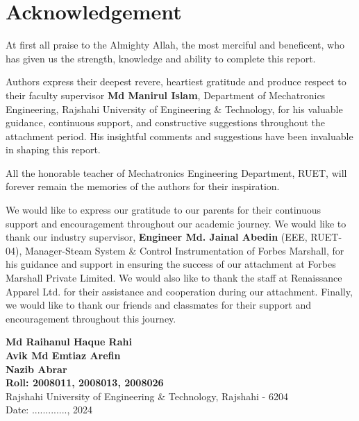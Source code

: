 \section*{Acknowledgement}
 
At first all praise to the Almighty Allah, the most merciful and beneficent, who has given us the strength, knowledge and ability to complete this report. 

Authors express their deepest revere, heartiest gratitude and produce respect to their faculty supervisor \textbf{Md Manirul Islam}, Department of Mechatronics Engineering, Rajshahi University of Engineering \& Technology, for his valuable guidance, continuous support, and constructive suggestions throughout the attachment period. His insightful comments and suggestions have been invaluable in shaping this report.

All the honorable teacher of Mechatronics Engineering Department, RUET, will forever remain the memories of the authors for their inspiration. 

We would like to express our gratitude to our parents for their continuous support and encouragement throughout our academic journey. We would like to thank our industry supervisor, \textbf{Engineer Md. Jainal Abedin} (EEE, RUET-04), Manager-Steam System \& Control Instrumentation of Forbes Marshall, for his guidance and support in ensuring the success of our attachment at Forbes Marshall Private Limited. We would also like to thank the staff at Renaissance Apparel Ltd. for their assistance and cooperation during our attachment. Finally, we would like to thank our friends and classmates for their support and encouragement throughout this journey.

\begin{flushright}
    \textbf{Md Raihanul Haque Rahi}\\
    \textbf{Avik Md Emtiaz Arefin}\\
    \textbf{Nazib Abrar}\\
    \textbf{Roll: 2008011, 2008013, 2008026}\\
    Rajshahi University of Engineering \& Technology, Rajshahi - 6204\\
    Date: ............., 2024  
\end{flushright}

 
 
 
 
 
